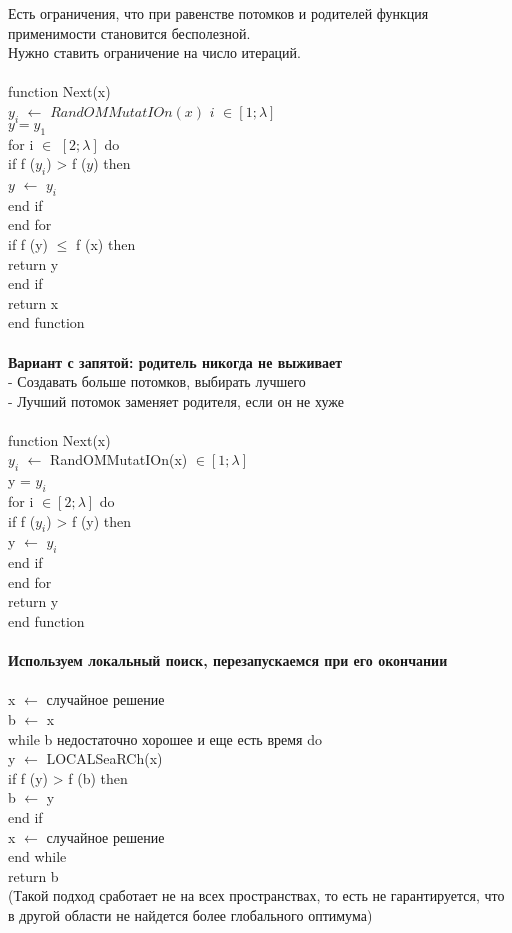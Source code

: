 Есть ограничения, что при равенстве потомков и родителей функция применимости становится бесполезной. \\
Нужно ставить ограничение на число итераций.\\
\\
function Next(x)  \\
\tab $y_i$ $\leftarrow$ $RandOMMutatIOn(x)$  $i$ $\in [1;\lambda]$  \\
\tab $y = y_1$   \\
\tab for i $\in$ $[2;\lambda]$ do  \\
\tab \tab if f ($y_i$) > f ($y$) then  \\
\tab \tab \tab $y$ $\leftarrow$ $y_i$   \\
\tab \tab end if \\ 
\tab end for  \\
\tab if f (y) $\le$ f (x) then \\
\tab \tab return y  \\
\tab end if  \\
\tab return x  \\
end function \\
\\
\textbf{Вариант с запятой: родитель никогда не выживает}\\
- Создавать больше потомков, выбирать лучшего\\ 
- Лучший потомок заменяет родителя, если он не хуже \\
\\
function Next(x)  \\
\tab $y_i$ $\leftarrow$ RandOMMutatIOn(x)  $\in [1;\lambda]$  \\
\tab y = $y_i$  \\
\tab for i $\in [2;\lambda]$ do  \\
\tab \tab if f ($y_i$) > f (y) then  \\
\tab \tab \tab y $\leftarrow$ $y_i$   \\
\tab \tab end if  \\
\tab end for  \\
\tab return y  \\
end function \\
\\
\textbf{Используем локальный поиск, перезапускаемся при его окончании \\}
\\
x $\leftarrow$ случайное решение  \\
b $\leftarrow$ x \\ 
while b недостаточно хорошее и еще есть время do \\
\tab y $\leftarrow$ LOCALSeaRCh(x)  \\
\tab if f (y) > f (b) then  \\
\tab \tab b $\leftarrow$ y  \\
\tab end if  \\
\tab x $\leftarrow$ случайное решение  \\
end while\\
return b\\

(Такой подход сработает не на всех пространствах, то есть не гарантируется, что в другой области не найдется более глобального оптимума)
